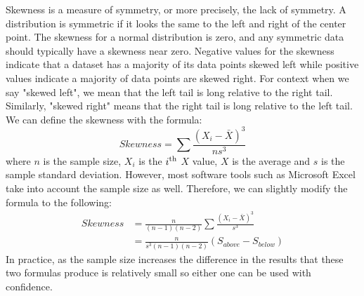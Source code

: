 Skewness is a measure of symmetry, or more precisely, the lack of symmetry. A 
distribution is symmetric if it looks the same to the left and right of the center 
point. The skewness for a normal distribution is zero, and any symmetric data 
should typically have a skewness near zero. Negative values for the skewness 
indicate that a dataset has a majority of its data points skewed left while positive 
values indicate a majority of data points are skewed right. For context when we
say "skewed left", we mean that the left tail is long relative to the right tail. 
Similarly, "skewed right" means that the right tail is long relative to the 
left tail. We can define the skewness with the formula:
\begin{equation}
    Skewness = \sum{}{} \frac{(X_i-\bar{X})^3}{ns^3}
\end{equation}
where $n$ is the sample size, $X_i$ is the $i\textsuperscript{th}$ $X$ value, $X$ 
is the average and $s$ is the sample standard deviation. However, most software 
tools such as Microsoft Excel take into account the sample size as well. Therefore,
we can slightly modify the formula to the following:
\begin{equation}
    \begin{split}
        Skewness & = \frac{n}{(n-1)(n-2)}\sum{}{} \frac{(X_i-\bar{X})^3}{s^3} \\
        & = \frac{n}{s^3(n-1)(n-2)}(S_{above} - S_{below})
    \end{split}
\end{equation}
In practice, as the sample size increases the difference in the results that these two 
formulas produce is relatively small so either one can be used with confidence. 

